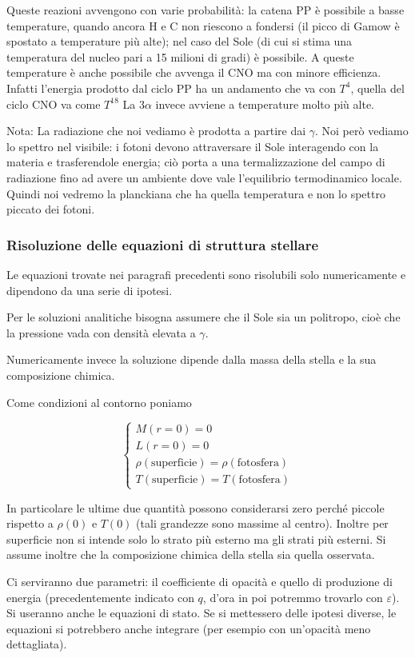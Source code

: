 Queste reazioni avvengono con varie probabilità: la catena PP è possibile a basse temperature, quando ancora H e C non riescono a fondersi (il picco di Gamow è spostato a temperature più alte); nel caso del Sole (di cui si stima una temperatura del nucleo pari a 15 milioni di gradi) è possibile. A queste temperature è anche possibile che avvenga il CNO ma con minore efficienza. Infatti l'energia prodotto dal ciclo PP ha un andamento che va con $T^4$, quella del ciclo CNO va come $T^{18}$ La $3\alpha$ invece avviene a temperature molto più alte.

Nota: La radiazione che noi vediamo è prodotta a partire dai $\gamma$. Noi però vediamo lo spettro nel visibile: i fotoni devono attraversare il Sole interagendo con la materia e trasferendole energia; ciò porta a una termalizzazione del campo di radiazione fino ad avere un ambiente dove vale l'equilibrio termodinamico locale. Quindi noi vedremo la planckiana che ha quella temperatura e non lo spettro piccato dei fotoni.

\subsubsection{Risoluzione delle equazioni di struttura stellare}
Le equazioni trovate nei paragrafi precedenti sono risolubili solo numericamente e dipendono da una serie di ipotesi.

Per le soluzioni analitiche bisogna assumere che il Sole sia un politropo, cioè che la pressione vada con densità elevata a $\gamma$.

Numericamente invece la soluzione dipende dalla massa della stella e la sua composizione chimica.

Come condizioni al contorno poniamo

$$\begin{cases}
    M(r=0)=0\\
    L(r=0)=0\\
    \rho(\text{superficie})=\rho(\text{fotosfera})\\
    T(\text{superficie})=T(\text{fotosfera})
\end{cases}$$

In particolare le ultime due quantità possono considerarsi zero perché piccole rispetto a $\rho(0)$ e $T(0)$ (tali grandezze sono massime al centro). Inoltre per superficie non si intende solo lo strato più esterno ma gli strati più esterni. Si assume inoltre che la composizione chimica della stella sia quella osservata.

Ci serviranno due parametri: il coefficiente di opacità e quello di produzione di energia (precedentemente indicato con $q$, d'ora in poi potremmo trovarlo con $\varepsilon$). Si useranno anche le equazioni di stato.
Se si mettessero delle ipotesi diverse, le equazioni si potrebbero anche integrare (per esempio con un'opacità meno dettagliata).

